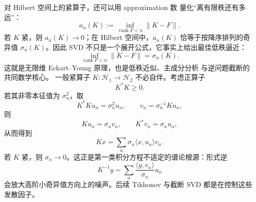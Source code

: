 对 Hilbert 空间上的紧算子，还可以用 approximation 数 量化“离有限秩还有多远”：
\[
a_n(K)
:=
\inf_{\operatorname{rank}F<n}\|K-F\|.
\]
若 $K$ 紧，则 $a_n(K)\to0$；在 Hilbert 空间中，$a_n(K)$ 恰等于按降序排列的奇异值 $\sigma_n(K)$。因此 SVD 不只是一个展开公式，它事实上给出最佳低秩逼近：
\begin{equation*}\inf_{\operatorname{rank}F<n}\|K-F\|
=\sigma_n(K).\end{equation*}
这就是无限维 Eckart--Young 原理，也是低秩近似、主成分分析 与逆问题截断的共同数学核心。
一般紧算子 $K:\mathcal H_1\to\mathcal H_2$ 不必自伴。考虑正算子
\[
K^*K\ge0.
\]
若其非零本征值为 $\sigma_n^2$，取
\[
K^*Ku_n=\sigma_n^2u_n,
\qquad
v_n=\sigma_n^{-1}Ku_n,
\]
则
\[
Ku_n=\sigma_nv_n,
\qquad
K^*v_n=\sigma_nu_n,
\]
从而得到
\[
{Kx=\sum_n\sigma_n\langle x,u_n\rangle v_n}.
\]
若 $K$ 紧，则 $\sigma_n\to0$。这正是第一类积分方程不适定的谱论根源：形式逆
\[
K^{-1}y\sim\sum_n\frac{\langle y,v_n\rangle}{\sigma_n}u_n
\]
会放大高阶小奇异值方向上的噪声。后续 Tikhonov 与截断 SVD 都是在控制这些发散因子。


